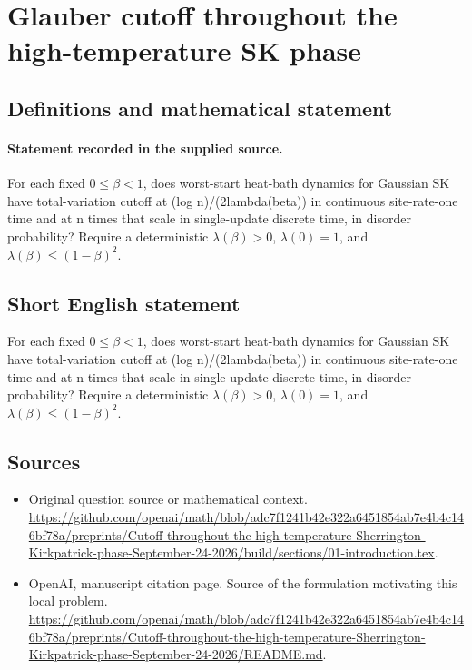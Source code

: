\documentclass[11pt]{article}
\begin{document}
\section*{Glauber cutoff throughout the high-temperature SK phase}\label{30007390}
\subsection{Definitions and mathematical statement}
\paragraph{Statement recorded in the supplied source.}
For each fixed $0\leq \beta <1$, does worst-start heat-bath dynamics for Gaussian SK have total-variation cutoff at (log n)/(2lambda(beta)) in continuous site-rate-one time and at n times that scale in single-update discrete time, in disorder probability? Require a deterministic $\lambda (\beta )>0$, $\lambda (0)=1$, and $\lambda (\beta )\leq (1-\beta )^2$.
\subsection{Short English statement}
For each fixed $0\leq \beta <1$, does worst-start heat-bath dynamics for Gaussian SK have total-variation cutoff at (log n)/(2lambda(beta)) in continuous site-rate-one time and at n times that scale in single-update discrete time, in disorder probability? Require a deterministic $\lambda (\beta )>0$, $\lambda (0)=1$, and $\lambda (\beta )\leq (1-\beta )^2$.
\subsection{Sources}
\begin{itemize}
\item[S1] Original question source or mathematical context.
\url{https://github.com/openai/math/blob/adc7f1241b42e322a6451854ab7e4b4c146bf78a/preprints/Cutoff-throughout-the-high-temperature-Sherrington-Kirkpatrick-phase-September-24-2026/build/sections/01-introduction.tex}.
\item[S2] OpenAI, manuscript citation page. Source of the formulation motivating this local problem.
\url{https://github.com/openai/math/blob/adc7f1241b42e322a6451854ab7e4b4c146bf78a/preprints/Cutoff-throughout-the-high-temperature-Sherrington-Kirkpatrick-phase-September-24-2026/README.md}.
\end{itemize}
\end{document}
